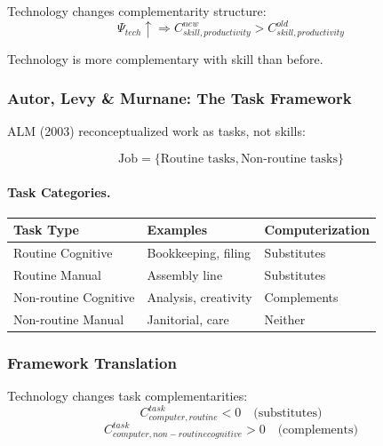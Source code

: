 Technology changes complementarity structure:
\begin{equation}
\Psi_{tech} \uparrow \Rightarrow C_{skill, productivity}^{new} > C_{skill, productivity}^{old}
\end{equation}

Technology is more complementary with skill than before.

\subsubsection{Autor, Levy \& Murnane: The Task Framework}

ALM (2003) reconceptualized work as tasks, not skills:

\begin{equation}
\boxed{
\text{Job} = \{\text{Routine tasks}, \text{Non-routine tasks}\}
}
\label{eq:alm}
\end{equation}

\paragraph{Task Categories.}
\begin{center}
\renewcommand{\arraystretch}{1.3}
\begin{tabular}{|l|l|l|}
\hline
\textbf{Task Type} & \textbf{Examples} & \textbf{Computerization} \\
\hline
Routine Cognitive & Bookkeeping, filing & Substitutes \\
Routine Manual & Assembly line & Substitutes \\
Non-routine Cognitive & Analysis, creativity & Complements \\
Non-routine Manual & Janitorial, care & Neither \\
\hline
\end{tabular}
\end{center}

\subsubsection{Framework Translation}

Technology changes task complementarities:
\begin{equation}
C_{computer, routine}^{task} < 0 \quad \text{(substitutes)}
\end{equation}
\begin{equation}
C_{computer, non-routine cognitive}^{task} > 0 \quad \text{(complements)}
\end{equation}

